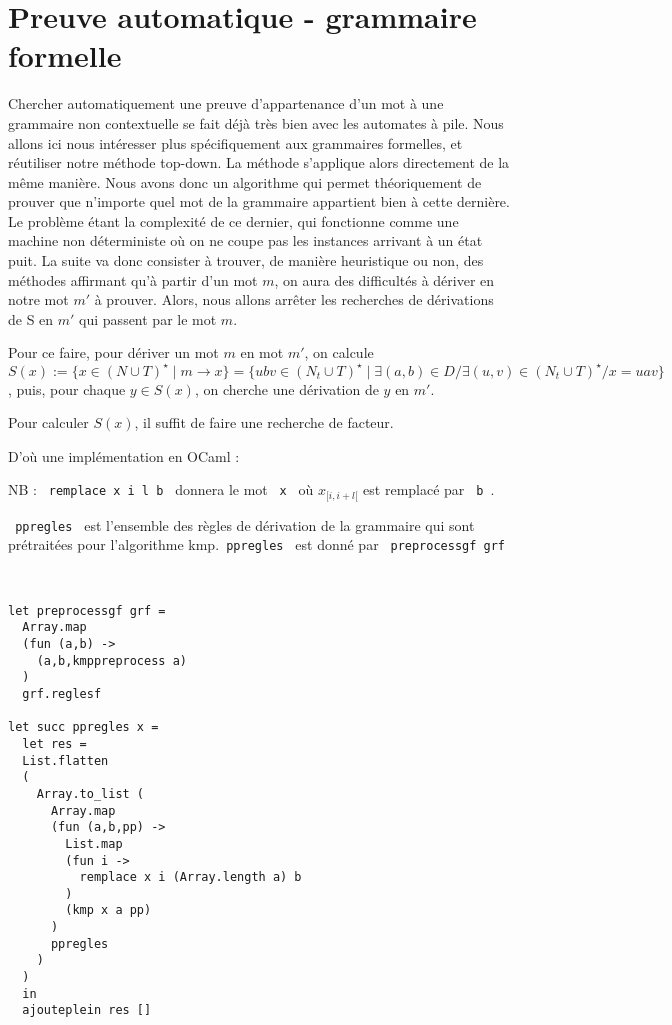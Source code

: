 \documentclass[a4paper,12pt]{article}
\begin{document}
\section{Preuve automatique - grammaire formelle}

Chercher automatiquement une preuve d'appartenance d'un mot à une grammaire non contextuelle se fait déjà très bien avec les automates à pile.
Nous allons ici nous intéresser plus spécifiquement aux grammaires formelles, et réutiliser notre méthode top-down.
La méthode s'applique alors directement de la même manière.
Nous avons donc un algorithme qui permet théoriquement de prouver que n'importe quel mot de la grammaire appartient bien à cette dernière.
Le problème étant la complexité de ce dernier, qui fonctionne comme une machine non déterministe où on ne coupe pas les instances arrivant à un état puit.
La suite va donc consister à trouver, de manière heuristique ou non, des méthodes affirmant qu'à partir d'un mot $m$, on aura des difficultés à dériver en notre mot $m'$ à prouver.
Alors, nous allons arrêter les recherches de dérivations de S en $m'$ qui passent par le mot $m$.

Pour ce faire, pour dériver un mot $m$ en mot $m'$, on calcule $S(x) := \{x \in (N\cup T)^\star \mid m \rightarrow x\} 
=\{ubv \in (N_t \cup T)^\star \mid \exists (a,b) \in D / \exists (u,v)\in (N_t \cup T)^\star / x = uav\}$,
puis, pour chaque $ y \in S(x)$, on cherche une dérivation de $y$ en $m'$.

Pour calculer $S(x)$, il suffit de faire une recherche de facteur.

D'où une implémentation en OCaml : 

{\color{gray} NB :  \texttt{ remplace x i l b } donnera le mot \texttt{ x } où $x_{[i,i+l[}$ est remplacé par \texttt{ b }.

\texttt{ ppregles } est l'ensemble des règles de dérivation de la grammaire qui 
sont prétraitées pour l'algorithme kmp.\texttt{ ppregles } est donné par \texttt{ preprocessgf grf }}\\
\begin{verbatim}
let preprocessgf grf =
  Array.map 
  (fun (a,b) ->
    (a,b,kmppreprocess a) 
  )
  grf.reglesf 

let succ ppregles x = 
  let res =
  List.flatten
  (
    Array.to_list (
      Array.map
      (fun (a,b,pp) ->
        List.map 
        (fun i ->
          remplace x i (Array.length a) b
        )
        (kmp x a pp)
      )
      ppregles
    )
  )
  in
  ajouteplein res []
\end{verbatim}
\end{document}
